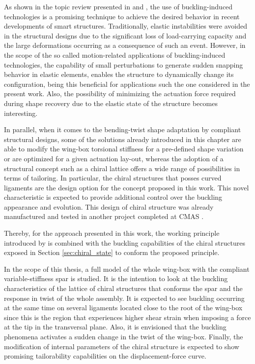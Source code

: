   As shown in the topic review presented in \cite{Hu2015} and \cite{Reis2015}, the use of buckling-induced technologies is a promising technique to achieve the desired behavior in recent developments of smart structures. Traditionally, elastic instabilities were avoided in the structural designs due to the significant loss of load-carrying capacity and the large deformations occurring as a consequence of such an event. However, in the scope of the so called motion-related applications of buckling-induced technologies, the capability of small perturbations to generate sudden snapping behavior in elastic elements, enables the structure to dynamically change its configuration, being this beneficial for applications such the one considered in the present work. Also, the possibility of minimizing the actuation force required during shape recovery due to the elastic state of the structure becomes interesting.

  In parallel, when it comes to the bending-twist shape adaptation by compliant structural designs, some of the solutions already introduced in this chapter are able to modify the wing-box torsional stiffness for a pre-defined shape variation or are optimized for a given actuation lay-out, whereas the adoption of a structural concept such as a chiral lattice offers a wide range of possibilities in terms of tailoring. In particular, the chiral structures that posses curved ligaments are the design option for the concept proposed in this work. This novel characteristic is expected to provide additional control over the buckling appearance and evolution. This design of chiral structure was already manufactured and tested in another project completed at CMAS \cite{Vincenz2017}.

  Thereby, for the approach presented in this work, the working principle introduced by \cite{Raither2013a} is combined with the buckling capabilities of the chiral structures exposed in Section \ref{sec:chiral_state} to conform the proposed principle. 

  In the scope of this thesis, a full model of the whole wing-box with the compliant variable-stiffness spar is studied. It is the intention to look at the buckling characteristics of the lattice of chiral structures that conforms the spar and the response in twist of the whole assembly. It is expected to see buckling occurring at the same time on several ligaments located close to the root of the wing-box since this is the region that experiences higher shear strain when imposing a force at the tip in the transversal plane. Also, it is envisioned that the buckling phenomena activates a sudden change in the twist of the wing-box. Finally, the modification of internal parameters of the chiral structure is expected to show promising tailorability capabilities on the displacement-force curve.

